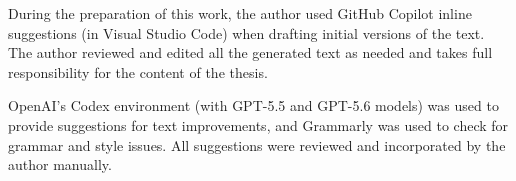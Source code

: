 \documentclass[12pt,a4paper,twoside,openright]{report}
\begin{document}


\tableofcontents














\label{ai-declaration}

During the preparation of this work, the author used GitHub Copilot inline suggestions (in Visual Studio Code) when drafting initial versions of the text. The author reviewed and edited all the generated text as needed and takes full responsibility for the content of the thesis.

OpenAI's Codex environment (with GPT-5.5 and GPT-5.6 models) was used to provide suggestions for text improvements, and Grammarly was used to check for grammar and style issues. All suggestions were reviewed and incorporated by the author manually.







\end{document}

